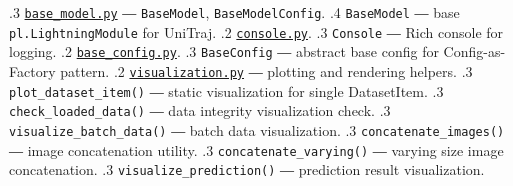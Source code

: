 {.3 \href{https://github.com/JanDuchscherer104/UniTraj/blob/main/unitraj/models/base_model/base_model.py}{\texttt{base\_model.py}} ― \texttt{BaseModel}, \texttt{BaseModelConfig}.
.4 \texttt{BaseModel} ― base \texttt{pl.LightningModule} for UniTraj.
.2 \href{https://github.com/JanDuchscherer104/UniTraj/blob/main/unitraj/utils/console.py}{\texttt{console.py}}.
.3 \texttt{Console} ― Rich console for logging.
.2 \href{https://github.com/JanDuchscherer104/UniTraj/blob/main/unitraj/utils/base_config.py}{\texttt{base\_config.py}}.
.3 \texttt{BaseConfig} ― abstract base config for Config-as-Factory pattern.
.2 \href{https://github.com/JanDuchscherer104/UniTraj/blob/main/unitraj/utils/visualization.py}{\texttt{visualization.py}} ― plotting and rendering helpers.
.3 \texttt{plot\_dataset\_item()} ― static visualization for single DatasetItem.
.3 \texttt{check\_loaded\_data()} ― data integrity visualization check.
.3 \texttt{visualize\_batch\_data()} ― batch data visualization.
.3 \texttt{concatenate\_images()} ― image concatenation utility.
.3 \texttt{concatenate\_varying()} ― varying size image concatenation.
.3 \texttt{visualize\_prediction()} ― prediction result visualization.
}
